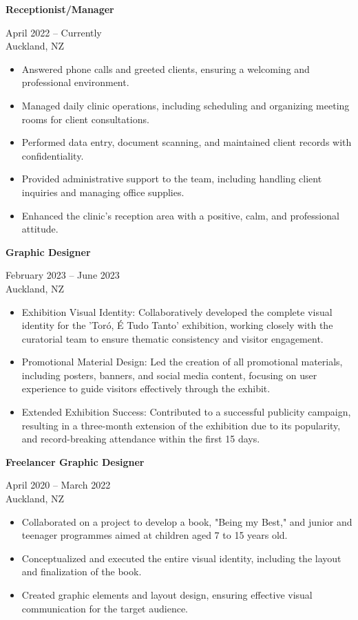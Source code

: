 \documentclass[10pt,a4paper,ragged2e,withhyper]{altacv}
\renewcommand{\cvevent}[4]{%
  \textbf{#1} %
  \hfill %
  \begin{minipage}[t]{.5\linewidth}
    \raggedleft %
    \small#3 %
    \\ %
    #4 %
  \end{minipage}
  \vspace{\baselineskip} %
}
\begin{document}

\cvevent{Receptionist/Manager}{Bonita Brazilian Beauty}{April 2022 -- Currently}{Auckland, NZ}
\begin{itemize}
  \item Answered phone calls and greeted clients, ensuring a welcoming and professional environment.
  \item Managed daily clinic operations, including scheduling and organizing meeting rooms for client consultations.
  \item Performed data entry, document scanning, and maintained client records with confidentiality.
  \item Provided administrative support to the team, including handling client inquiries and managing office supplies.
  \item Enhanced the clinic's reception area with a positive, calm, and professional attitude.
\end{itemize}

\divider

\cvevent{Graphic Designer}{Auckland War Memorial Museum (Contract)}{February 2023 -- June 2023}{Auckland, NZ}
\begin{itemize}
  \item Exhibition Visual Identity: Collaboratively developed the complete visual identity for the 'Toró, É Tudo Tanto' exhibition, working closely with the curatorial team to ensure thematic consistency and visitor engagement.
  \item Promotional Material Design: Led the creation of all promotional materials, including posters, banners, and social media content, focusing on user experience to guide visitors effectively through the exhibit.
  \item Extended Exhibition Success: Contributed to a successful publicity campaign, resulting in a three-month extension of the exhibition due to its popularity, and record-breaking attendance within the first 15 days.
\end{itemize}

\divider

\cvevent{Freelancer Graphic Designer}{Sue Lyon}{April 2020 -- March 2022}{Auckland, NZ}
\begin{itemize}
  \item Collaborated on a project to develop a book, "Being my Best," and junior and teenager programmes aimed at children aged 7 to 15 years old.
  \item Conceptualized and executed the entire visual identity, including the layout and finalization of the book.
  \item Created graphic elements and layout design, ensuring effective visual communication for the target audience.
\end{itemize}
\end{document}
